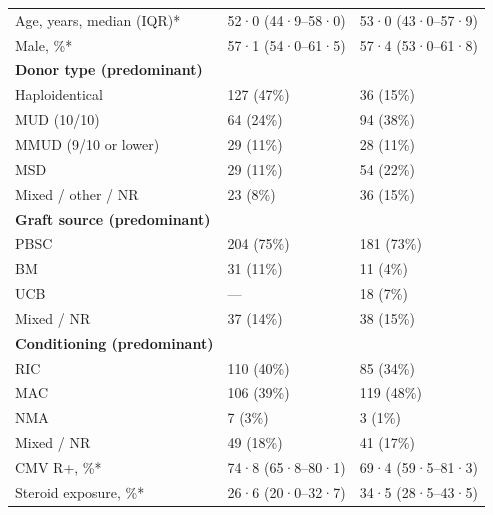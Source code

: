 \documentclass[
  british,
  8.6pt,
  a4paper,
  twocolumn]{article}
\begin{document}
\begin{longtable}[]{@{}lll@{}}
Age, years, median (IQR)* & 52·0 (44·9--58·0) & 53·0 (43·0--57·9) \\
Male, \%* & 57·1 (54·0--61·5) & 57·4 (53·0--61·8) \\
\textbf{Donor type (predominant)} & & \\
Haploidentical & 127 (47\%) & 36 (15\%) \\
MUD (10/10) & 64 (24\%) & 94 (38\%) \\
MMUD (9/10 or lower) & 29 (11\%) & 28 (11\%) \\
MSD & 29 (11\%) & 54 (22\%) \\
Mixed / other / NR & 23 (8\%) & 36 (15\%) \\
\textbf{Graft source (predominant)} & & \\
PBSC & 204 (75\%) & 181 (73\%) \\
BM & 31 (11\%) & 11 (4\%) \\
UCB & --- & 18 (7\%) \\
Mixed / NR & 37 (14\%) & 38 (15\%) \\
\textbf{Conditioning (predominant)} & & \\
RIC & 110 (40\%) & 85 (34\%) \\
MAC & 106 (39\%) & 119 (48\%) \\
NMA & 7 (3\%) & 3 (1\%) \\
Mixed / NR & 49 (18\%) & 41 (17\%) \\
CMV R+, \%* & 74·8 (65·8--80·1) & 69·4 (59·5--81·3) \\
Steroid exposure, \%* & 26·6 (20·0--32·7) & 34·5 (28·5--43·5) \\
\end{longtable}

\newpage{}
\end{document}
